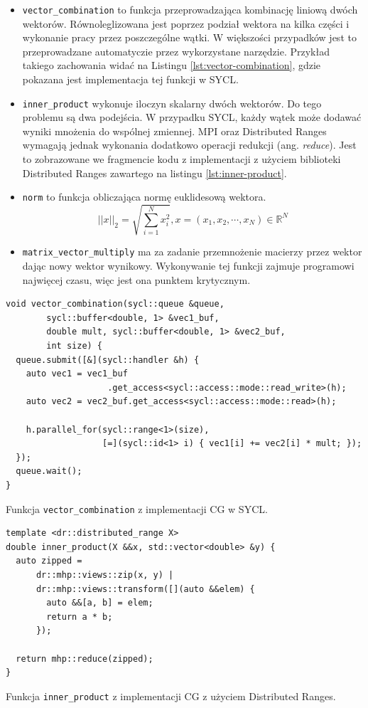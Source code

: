 \documentclass[a4paper,12pt]{book} %
\begin{document}
\begin{itemize}
\item \texttt{vector\_combination} to funkcja przeprowadzająca kombinację liniową dwóch wektorów. Równoleglizowana jest poprzez podział wektora na kilka części i wykonanie pracy przez poszczególne wątki. W większości przypadków jest to przeprowadzane automatyczie przez wykorzystane narzędzie. Przykład takiego zachowania widać na Listingu \ref{lst:vector-combination}, gdzie pokazana jest implementacja tej funkcji w SYCL.
\item \texttt{inner\_product} wykonuje iloczyn skalarny dwóch wektorów. Do tego problemu są dwa podejścia. W przypadku SYCL, każdy wątek może dodawać wyniki mnożenia do wspólnej zmiennej. MPI oraz Distributed Ranges wymagają jednak wykonania dodatkowo operacji redukcji (ang. \emph{reduce}). Jest to zobrazowane we fragmencie kodu z implementacji z użyciem biblioteki Distributed Ranges zawartego na listingu \ref{lst:inner-product}.
\item \texttt{norm} to funkcja obliczająca normę euklidesową wektora. $$||x||_2 = \sqrt{\sum_{i=1}^Nx^2_i}, x = (x_1,x_2,\cdots,x_N) \in \mathbb{R}^N$$
\item \texttt{matrix\_vector\_multiply} ma za zadanie przemnożenie macierzy przez wektor dając nowy wektor wynikowy. Wykonywanie tej funkcji zajmuje programowi najwięcej czasu, więc jest ona punktem krytycznym. 
\end{itemize}

\begin{lstfloat}
\lstset{language=C++}
\begin{lstlisting}[frame=single]
void vector_combination(sycl::queue &queue, 
		sycl::buffer<double, 1> &vec1_buf,
        double mult, sycl::buffer<double, 1> &vec2_buf,
        int size) {
  queue.submit([&](sycl::handler &h) {
    auto vec1 = vec1_buf
    				.get_access<sycl::access::mode::read_write>(h);
    auto vec2 = vec2_buf.get_access<sycl::access::mode::read>(h);

    h.parallel_for(sycl::range<1>(size),
                   [=](sycl::id<1> i) { vec1[i] += vec2[i] * mult; });
  });
  queue.wait();
}
\end{lstlisting}
\caption{Funkcja \texttt{vector\_combination} z implementacji CG w SYCL.}
\label{lst:vector-combination}
\end{lstfloat}

\begin{lstfloat}
\lstset{language=C++}
\begin{lstlisting}[frame=single]
template <dr::distributed_range X>
double inner_product(X &&x, std::vector<double> &y) {
  auto zipped =
      dr::mhp::views::zip(x, y) | 
      dr::mhp::views::transform([](auto &&elem) {
        auto &&[a, b] = elem;
        return a * b;
      });

  return mhp::reduce(zipped);
}
\end{lstlisting}
\caption{Funkcja \texttt{inner\_product} z implementacji CG z użyciem Distributed Ranges.}
\label{lst:inner-product}
\end{lstfloat}
\end{document}
